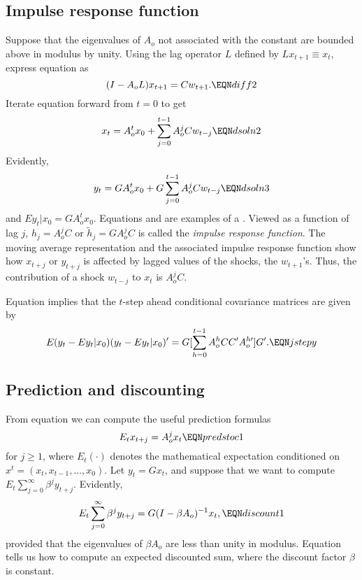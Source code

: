 %
\subsection{Impulse response function}
Suppose that the eigenvalues of $A_o$ not associated with
the constant are bounded above in modulus  by unity.  Using
the lag operator $L$ defined by $L x_{t+1} \equiv x_t$,
express equation  as
$$ (I - A_o L) x_{t+1} = C w_{t+1} . \EQN diff2 $$
Iterate equation  forward from
$t=0$ to get
$$ x_t = A_o^t x_0 + \sum_{j=0}^{t-1} A_o^j C w_{t-j}
  \EQN dsoln2 $$
Evidently, $$ y_t =G A_o^t x_0 + G\sum_{j=0}^{t-1} A_o^j C w_{t-j}
  \EQN dsoln3 $$
and $E y_t | x_0 = G A_o^t x_0$.
Equations %
  and 
 are examples of
a .
Viewed as a function of lag $j$, $h_j = A_o^j C$  or $\tilde h_j = G
A_o^j C$  is called
the {\it impulse response function\/}. %
  The moving average representation
and the associated impulse response function show
how $x_{t+j}$ or $y_{t+j}$ is affected by lagged values
of the shocks, the $w_{t+1}$'s.  Thus, the contribution of a shock
$w_{t-j}$ to $x_t$ is $A_o^jC$.

Equation  implies that the $t$-step ahead conditional covariance matrices
are given by
$$ E(y_t - E y_t | x_0)(y_t - E y_t | x_0)'
= G[ \sum_{h=0}^{t-1} A_o^h C C' A_o^{h \prime} ] G'. \EQN jstepy $$
 
\subsection{Prediction and discounting}
  From equation  we can compute the useful prediction formulas
$$ E_t x_{t+j} = A_o^j x_t \EQN predstoc1  $$
for $j \geq 1$, where $E_t(\cdot)$ denotes the mathematical
expectation conditioned on $x^t = (x_t, x_{t-1}, \ldots, x_0)$.
Let $y_t = G x_t$, and  suppose that we want to compute
$ E_t \sum_{j=0}^\infty \beta^j y_{t+j} $.
Evidently,
$$ E_t \sum_{j=0}^\infty \beta^j y_{t+j} = G(I -\beta A_o)^{-1} x_t,
\EQN discount1 $$
provided that the eigenvalues of $\beta A_o$ are less than
unity in modulus.  Equation  tells us how to compute
an expected discounted sum, where the discount factor $\beta$ is
constant.

